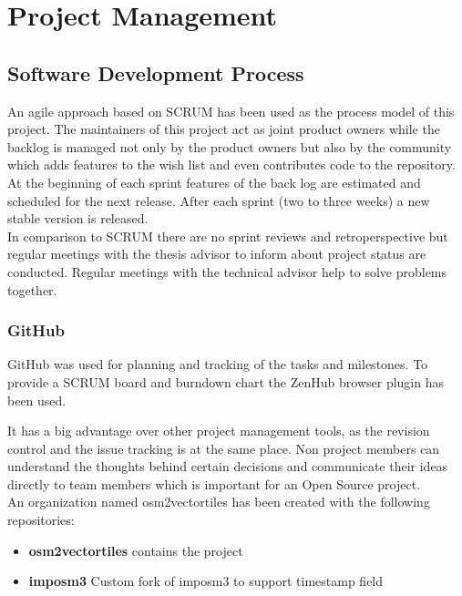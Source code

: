 \chapter{Project Management}\label{project-management}

\section{Software Development Process}


An agile approach based on SCRUM has been used as the process model of this project.
The maintainers of this project act as joint product owners while the backlog is managed not only
by the product owners but also by the community which adds features to the wish list and even contributes code to the repository.\\

At the beginning of each sprint features of the back log are estimated and scheduled for the next release. After each sprint (two to three weeks) a new stable version is released.\\

In comparison to SCRUM there are no sprint reviews and retroperspective but regular meetings with the thesis advisor to inform about project status are conducted.
Regular meetings with the technical advisor help to solve problems together.

\subsection{GitHub}\label{github}
GitHub was used for planning and tracking of the tasks and milestones.
To provide a SCRUM board and burndown chart the ZenHub browser plugin has been used.


It has a big advantage over other project management tools, as the revision control and the issue tracking is at the same place.
Non project members can understand the thoughts behind certain decisions and communicate their ideas directly to team members which is important for an Open Source project.\\

An organization named osm2vectortiles has been created with the following repositories:

\begin{itemize}
\item
  \textbf{osm2vectortiles} contains the project
\item
  \textbf{imposm3} Custom fork of imposm3 to support timestamp field
\end{itemize}

